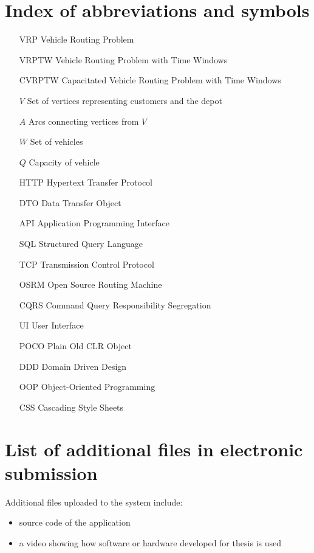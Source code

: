 \documentclass[a4paper,twoside,12pt]{book}
\begin{document}
\begin{appendices} 


 

\chapter*{Index of abbreviations and symbols}

\begin{itemize}
\item[VRP] Vehicle Routing Problem
\item[VRPTW] Vehicle Routing Problem with Time Windows
\item[CVRPTW] Capacitated Vehicle Routing Problem with Time Windows
\item[$V$] Set of vertices representing customers and the depot
\item[$A$] Arcs connecting vertices from $V$
\item[$W$] Set of vehicles
\item[$Q$] Capacity of vehicle
\item[HTTP] Hypertext Transfer Protocol
\item[DTO] Data Transfer Object
\item[API] Application Programming Interface
\item[SQL] Structured Query Language
\item[TCP] Transmission Control Protocol
\item[OSRM] Open Source Routing Machine
\item[CQRS] Command Query Responsibility Segregation
\item[UI] User Interface
\item[POCO] Plain Old CLR Object
\item[DDD] Domain Driven Design
\item[OOP] Object-Oriented Programming
\item[CSS] Cascading Style Sheets
\end{itemize}

\chapter*{List of additional files in electronic submission }

Additional files uploaded to the system include:
\begin{itemize}
\item source code of the application
\item a video showing how software or hardware developed for thesis is used
\end{itemize}
 
\listoffigures
{}
\listoftables
{}
	

\end{appendices}
\end{document}
